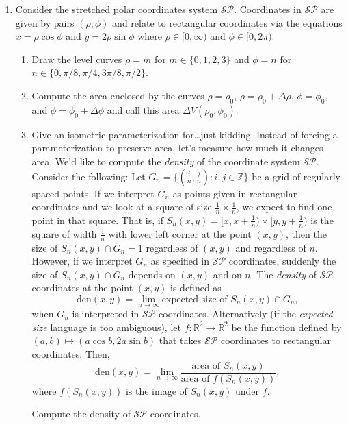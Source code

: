 \documentclass[letter]{article}
\newcommand{\R}{\mathbb{R}}
\newcommand{\Z}{\mathbb{Z}}
\begin{document}
\begin{enumerate}
		\item Consider the stretched polar coordinates system $\mathcal {SP}$.
			Coordinates in $\mathcal {SP}$ are given by pairs $(\rho, \phi)$ and relate to
			rectangular coordinates via the equations $x=\rho \cos \phi$ and $y=2\rho\sin \phi$ where $\rho\in[0,\infty)$
				and $\phi\in[0,2\pi)$.
		\begin{enumerate}
			\item Draw the level curves $\rho = m$ for $m\in \{0,1,2,3\}$ and $\phi=n$ 
				for $n\in\{0,\pi/8,\pi/4,3\pi/8,\pi/2\}$.
			\item Compute the area enclosed by the curves $\rho=\rho_0$, $\rho=\rho_0+\Delta \rho$,
				$\phi=\phi_0$, and $\phi=\phi_0+\Delta\phi$ and call this area $\Delta V(\rho_0,\phi_0)$.
			\item Give an isometric parameterization for{\ldots}just kidding. Instead of forcing a parameterization
				to preserve area, let's measure how much it changes area.  We'd like to compute
				the \emph{density} of the coordinate system $\mathcal{SP}$.  Consider the following: 
				Let $G_n=\{(\frac{i}{n},\frac{j}{n}):i,j\in \Z\}$ be a grid of regularly spaced points.
				If we interpret $G_n$ as points given in rectangular coordinates and we look at a
				square of size $\frac{1}{n}\times \frac{1}{n}$, we expect to find one point in that square.
				That is, if $S_n(x,y)=[x,x+\frac{1}{n})\times[y,y+\frac{1}{n})$ is the square of width $\frac{1}{n}$
				with lower left corner at the point $(x,y)$, then the size of $S_n(x,y)\cap G_n=1$ regardless of $(x,y)$ and
				regardless of $n$.  However, if we interpret $G_n$ as specified in $\mathcal{SP}$ coordinates,
				suddenly the size of $S_n(x,y)\cap G_n$ depends on $(x,y)$ and on $n$. The \emph{density} of $\mathcal{SP}$
				coordinates at the point $(x,y)$ is defined as
				\vspace{-.2cm}
				\[
					\mathrm{den}(x,y) = \lim_{n\to\infty}\text{expected size of }S_n(x,y)\cap G_n,
				\]
				when $G_n$ is interpreted in $\mathcal {SP}$ coordinates.
				Alternatively (if the \emph{expected size} language is too ambiguous), let
				$f:\R^2\to\R^2$ be the function defined by $(a,b)\mapsto (a\cos b, 2a\sin b)$
				that takes $\mathcal{SP}$ coordinates to rectangular coordinates.
				Then,
				\[
					\mathrm{den}(x,y) = \lim_{n\to\infty}\frac{\text{area of }S_n(x,y)}{\text{area of }f(S_n(x,y))},
				\]
				where $f(S_n(x,y))$ is the image of $S_n(x,y)$ under $f$.

				\vspace{.3cm}
				Compute the density of $\mathcal{SP}$ coordinates.
		\end{enumerate}

	\end{enumerate}
\end{document}
